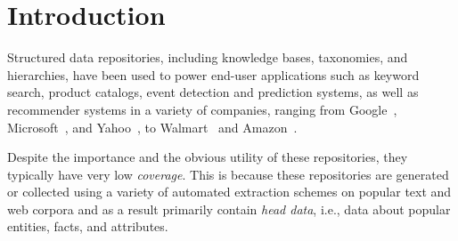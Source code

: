 


\section{Introduction}
\label{sec:intro}


Structured data repositories, including knowledge bases, taxonomies, and hierarchies, 
have been used to power end-user applications such as keyword search,
product catalogs, event detection and prediction systems,
as well as recommender systems in a variety of companies,
ranging from Google~\cite{singhal2012introducing}, Microsoft~\cite{cheng2010fuzzy}, and Yahoo~\cite{woo}, to 
Walmart~\cite{Deshpande:2013:BMU:2463676.2465297} and Amazon~\cite{amazon-product}.

Despite the importance and the obvious utility of these repositories,
they typically have very low {\em coverage}.
This is because these repositories are generated or collected using a variety
of automated extraction schemes on popular text and web corpora and as a result 
primarily contain {\em head data}, i.e., data about popular entities,
facts, and attributes.





